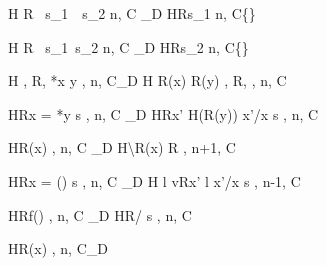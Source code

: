 \begin{figure}
\begin{minipage}{\textwidth}
\vspace{2mm}

{\langle H \coma R \coma \IFNULL\Sirx \ \THEN   s_{1}\ \ELSE\  s_{2} \coma  n, C \rangle
  \xlongrightarrow{\snull}_D
  \langle H\coma R\coma s_{1} \coma n, C\cup \{\snull\} \rangle}

\vspace{2mm}

{\langle H \coma R \coma \IFNULL\Sirx\ \THEN  s_{1}\ \ELSE  s_{2} \coma  n, C\rangle
  \xlongrightarrow{\snnull}_D
  \langle H\coma R\coma s_{2} \coma  n, C\cup \{\snnull\} \rangle}

\vspace{2mm}

{ \langle H , R, *x \leftarrow y , n, C\rangle \xlongrightarrow{}_{D}
  \langle H \Lfc R(x) \mapsto R(y) \Rfc , R, \SKIP , n, C \rangle }

\vspace{2mm}

{\langle H\coma R\coma  \LET x = *y \; \IN s , n, C \rangle
  \longrightarrow_{D}
  \langle H\coma R\Lfc x' \mapsto H(R(y)) \Rfc \coma   \Lb x'/x \Rb s , n, C\rangle }

\vspace{2mm}

{\langle H\coma R\coma \Free(x) , n, C \rangle \xlongrightarrow{\Free}_{D}
  \langle H\backslash R(x) \coma R \coma \SKIP , n+1, C \rangle}

\vspace{2mm}

{\langle H\coma R\coma  \LET x = \Malloc() \; \IN s , n, C\rangle
  \xlongrightarrow{\Malloc}_{D}
  \langle H \Lfc l \mapsto v\Rfc \coma R\Lfc x' \mapsto l \Rfc \coma   \Lb x'/x \Rb s , n-1, C  \rangle }

\vspace{2mm}
\begin{minipage}{0.5\textwidth}
{ \langle H\coma R\coma  f() , n, C\rangle
  \longrightarrow_{D}
  \langle H\coma R\coma  \Lb {}/ \Rb s , n, C \rangle}
\end{minipage}
\begin{minipage}{0.5\textwidth}
{\langle H\coma R\coma \Free(x) , n, C\rangle \xlongrightarrow{\Free}_{D} \MEMEX}
\end{minipage}
\vspace{2mm}


\end{minipage}
\end{figure}
